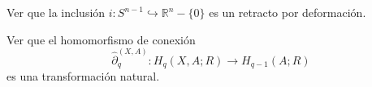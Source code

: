 \begin{ejercicio}
Ver que la inclusión $i \colon S^{n-1} \hookrightarrow \mathbb{R}^n - \{0\}$ es un retracto por deformación.
\end{ejercicio}

\begin{ejercicio}
Ver que el homomorfismo de conexión
\[
\hat{\partial}_q^{(X, A)} \colon H_q(X, A; R) \longrightarrow H_{q-1}(A; R)
\]
es una transformación natural.
\end{ejercicio}

